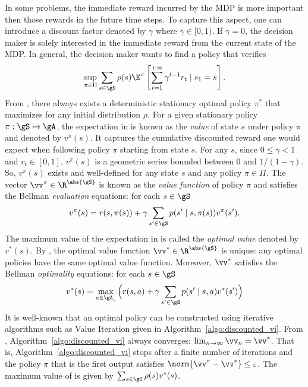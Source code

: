In some problems, the immediate reward incurred by the MDP is more important then those rewards in the future time steps.
To capture this aspect, one can introduce a discount factor denoted by $\gamma$ where $\gamma\in[0,1)$.
If $\gamma=0$, the decision maker is solely interested in the immediate reward from the current state of the MDP.
In general, the decision maker wants to find a policy that verifies
\begin{equation}
    \label{eq:discount_obj}
    \sup_{\pi\in\Pi}\sum_{s\in\gS}\rho(s)\E^\pi\left[\sum_{t=1}^{+\infty} \gamma^{t-1}r_t \mid s_1=s\right].
\end{equation}
From \cite[Chapter~6]{puterman2014markov}, there always exists a deterministic stationary optimal policy $\pi^*$ that maximizes  for any initial distribution $\rho$.
For a given stationary policy $\pi:\gS\mapsto\gA$, the expectation in  is known as the \emph{value} of state $s$ under policy $\pi$ and denoted by $v^\pi(s)$.
It captures the cumulative discounted reward one would expect when following policy $\pi$ starting from state $s$.
For any $s$, since $0\le\gamma<1$ and $r_t\in[0,1]$, $v^\pi(s)$ is a geometric series bounded between $0$ and $1/(1-\gamma)$.
So, $v^\pi(s)$ exists and well-defined for any state $s$ and any policy $\pi\in\Pi$.
The vector $\vv^\pi\in\R^{\abs{\gS}}$ is known as the \emph{value function} of policy $\pi$ and satisfies the Bellman \emph{evaluation} equations: for each $s\in\gS$
\begin{equation}
    \label{eq:discount_be_eval}
    v^\pi(s) =r(s,\pi(s)) +\gamma\sum_{s'\in\gS}p(s'\mid s,\pi(s))v^\pi(s').
\end{equation}
The maximum value of the expectation in  is called the \emph{optimal value} denoted by $v^*(s)$.
By \cite[Theorem~6.2.5]{puterman2014markov}, the optimal value function $\vv^*\in\R^{\abs{\gS}}$ is unique: any optimal policies have the same optimal value function.
Moreover, $\vv^*$ satisfies the Bellman \emph{optimality} equations: for each $s\in\gS$
\begin{equation}
    \label{eq:discount_be_opt}
     v^*(s)= \max_{a\in\gA_s}\Big(r(s, a) +\gamma\sum_{s'\in\gS}p(s'\mid s,a)v^*(s')\Big)
\end{equation}
It is well-known that an optimal policy can be constructed using iterative algorithms such as Value Iteration given in Algorithm~\ref{algo:discounted_vi}.
From \cite[Chapter~6]{puterman2014markov}, Algorithm~\ref{algo:discounted_vi} always converges: $\lim_{n\to\infty}\vv_n=\vv^*$.
That is, Algorithm~\ref{algo:discounted_vi} stops after a finite number of iterations and the policy $\pi$ that is the first output satisfies $\norm{\vv^\pi-\vv^*}\le \varepsilon$.
The maximum value of  is given by $\sum_{s\in\gS}\rho(s)v^*(s)$.

